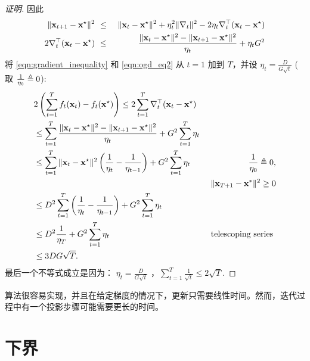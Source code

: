 \begin{proof}[证明]
因此
\begin{eqnarray} \label{eqn:ogd_eq2}
\|\bx_{t+1}-\bx^\star\|^2\ &\leq&\ \|\bx_t- \bx^\star\|^2 + \eta_t^2
\|\nabla_t\|^2 -2 \eta_t \nabla_t^\top (\bx_t -\bx^\star)\nonumber\\
2 \nabla_t^\top (\bx_t-\bx^\star)\ &\leq&\ \frac{ \|\bx_t-
\bx^\star\|^2-\|\bx_{t+1}-\bx^\star\|^2}{\eta_t} + \eta_t G^2
\end{eqnarray}
将 \eqref{eqn:gradient_inequality} 和 \eqref{eqn:ogd_eq2} 从 $t= 1$ 加到 $T$，并设
$\eta_t = \frac{D}{G \sqrt{t}}$ (
取
$\frac{1}{\eta_0} \equaltri 0$):
\begin{align*}
& 2 \left( \sum_{t=1}^T f_t(\bx_t)-f_t(\bx^\star) \right ) \leq 2\sum_{t=1}^T \nabla_t^\top (\xv - \x^\star) \\
&\leq  \sum_{t=1}^T \frac{ \|\bx_t-
	\bx^\star\|^2-\|\bx_{t+1}-\bx^\star\|^2}{\eta_t} + G^2 \sum_{t=1}^T \eta_t    \\
&\leq  \sum_{t=1}^T \|\bx_t - \bx^\star\|^2 \left(
\frac{1}{\eta_{t}} -
\frac{1}{\eta_{t-1}} \right) + G^2 \sum_{t=1}^T \eta_t & \frac{1}{\eta_0} \equaltri 0, \\
& &  \|\xv[T+1] - \xv[]^* \|^2 \geq 0 \\
&\leq D^2 \sum_{t=1}^T \left(
\frac{1}{\eta_{t}} -
\frac{1}{\eta_{t-1}} \right) + G^2 \sum_{t=1}^T \eta_t \\
& \leq  D^2  \frac{1}{\eta_{T}}  + G^2 \sum_{t=1}^T \eta_t  & \mbox{ telescoping series } \\
& \leq 3 DG \sqrt{T}.
\end{align*}
最后一个不等式成立是因为：
$\eta_t = \frac{D}{G \sqrt{t}}$ ，$\sum_{t=1}^T \frac{1}{\sqrt{t}} \leq 2 \sqrt{T}$.
\end{proof}


\ogd 算法很容易实现，并且在给定梯度的情况下，更新只需要线性时间。然而，迭代过程中有一个投影步骤可能需要更长的时间。







\section{
	下界
	} \label{section:lowerbound}



